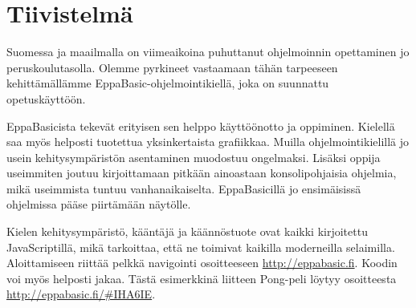 
\section*{Tiivistelmä}
Suomessa ja maailmalla on viimeaikoina puhuttanut
ohjelmoinnin opettaminen jo peruskoulutasolla.
Olemme pyrkineet vastaamaan tähän tarpeeseen
kehittämällämme EppaBasic-ohjelmointikiellä, joka
on suunnattu opetuskäyttöön.

EppaBasicista tekevät erityisen sen helppo käyttöönotto
ja oppiminen. Kielellä saa myös helposti tuotettua
yksinkertaista grafiikkaa. Muilla ohjelmointikielillä
jo usein kehitysympäristön asentaminen muodostuu ongelmaksi.
Lisäksi oppija useimmiten joutuu kirjoittamaan pitkään
ainoastaan konsolipohjaisia ohjelmia, mikä useimmista
tuntuu vanhanaikaiselta. EppaBasicillä jo ensimäisissä
ohjelmissa pääse piirtämään näytölle.

Kielen kehitysympäristö, kääntäjä ja käännöstuote ovat
kaikki kirjoitettu JavaScriptillä, mikä tarkoittaa, että
ne toimivat kaikilla moderneilla selaimilla. Aloittamiseen
riittää pelkkä navigointi osoitteeseen \url{http://eppabasic.fi}.
Koodin voi myös helposti jakaa. Tästä esimerkkinä liitteen
Pong-peli löytyy osoitteesta \url{http://eppabasic.fi/#IHA6IE}.